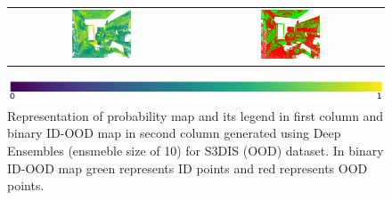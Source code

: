 \begin{figure}[h!]
\begin{tabular}{cc}
            \includegraphics[width=0.33\textwidth, height=0.18\textheight]{images/ood_imgs/de_s3dis/ofc_42_de_prob.pdf}& 
            \includegraphics[width=0.33\textwidth, height=0.18\textheight]{images/ood_imgs/de_s3dis/de_prob_1.pdf}\\
        \end{tabular}
        \includegraphics[scale=0.45]{images/prob_legend.pdf}
        \caption{Representation of probability map and its legend in first column and binary ID-OOD map in second column generated using Deep Ensembles (ensmeble size of 10) for S3DIS (OOD) dataset. In binary ID-OOD map green represents ID points and red represents OOD points.}
        \label{fig:de_s3dis_oodmap_prob}
    \end{figure}
